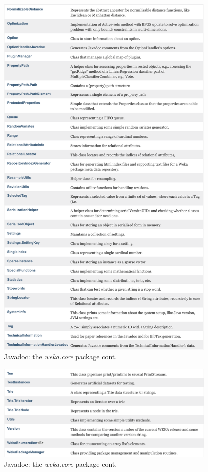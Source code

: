 \begin{figure}[!thp]
\ContinuedFloat
\centering
\includegraphics[width=0.95\textwidth]{images/B5_1b2_3.png}
\caption{Javadoc: the \textit{weka.core} package cont.}
\end{figure}

\begin{figure}[!thp]
\ContinuedFloat
\centering
\includegraphics[width=0.95\textwidth]{images/B5_1b2_4.png}
\caption{Javadoc: the \textit{weka.core} package cont.}
\label{fig:javadoc_b}
\end{figure}

